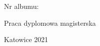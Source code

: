 \pagestyle{empty}
{
    \begin{center}
        \Large \unisl
    \end{center}
    \begin{center}
        \Large \wydzial
    \end{center}
    \vfill
    \begin{center}
        \Large \autor
    \end{center}
    \begin{center}
        \large Nr albumu: \albumnum
    \end{center}
    \vfill
    \begin{center}
        \Large \tytul\par
    \end{center}
    \vfill

    \begin{center}
        \Large Praca dyplomowa magisterska
    \end{center}

    \vfill

    \vfill

    \vbox
    {
        \Large \hfill  \promotor
    }
    \vfill

    \begin{center}
        \Large  Katowice 2021
    \end{center}
    \restoregeometry
}
